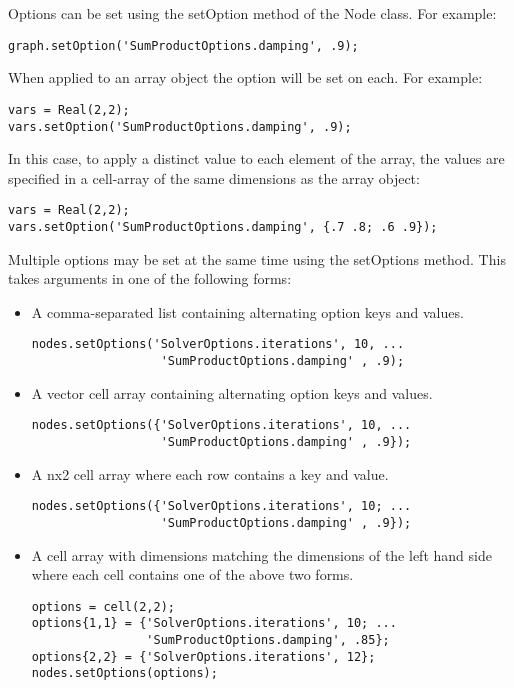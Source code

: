 \ifmatlab
Options can be set using the setOption method of the Node class.  For example:

\begin{lstlisting}
graph.setOption('SumProductOptions.damping', .9);
\end{lstlisting}

When applied to an array object the option will be set on each.  For example:

\begin{lstlisting}
vars = Real(2,2);
vars.setOption('SumProductOptions.damping', .9);
\end{lstlisting}

In this case, to apply a distinct value to each element of the array, the values are specified in a cell-array of the same dimensions as the array object:

\begin{lstlisting}
vars = Real(2,2);
vars.setOption('SumProductOptions.damping', {.7 .8; .6 .9});
\end{lstlisting}

Multiple options may be set at the same time using the setOptions method. This takes arguments in one of the following forms:

\begin{itemize}
\item A comma-separated list containing alternating option keys and values.
\begin{lstlisting}
nodes.setOptions('SolverOptions.iterations', 10, ...
                  'SumProductOptions.damping' , .9);
\end{lstlisting}
\item A vector cell array containing alternating option keys and values.
\begin{lstlisting}
nodes.setOptions({'SolverOptions.iterations', 10, ...
                  'SumProductOptions.damping' , .9});
\end{lstlisting}
\item A nx2 cell array where each row contains a key and value.
\begin{lstlisting}
nodes.setOptions({'SolverOptions.iterations', 10; ...
                  'SumProductOptions.damping' , .9});
\end{lstlisting}
\item A cell array with dimensions matching the dimensions of the left hand side where each cell contains one of the above two forms.
\begin{lstlisting}
options = cell(2,2);
options{1,1} = {'SolverOptions.iterations', 10; ...
                'SumProductOptions.damping', .85};
options{2,2} = {'SolverOptions.iterations', 12};
nodes.setOptions(options);
\end{lstlisting}
\end{itemize}

